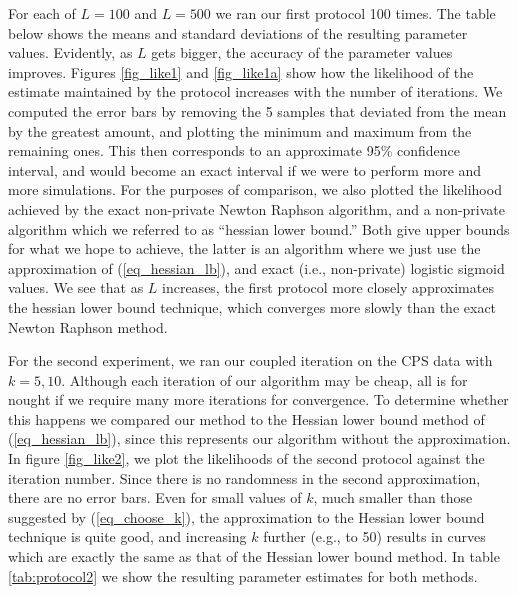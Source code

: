 \documentclass[11pt]{article}
\begin{document}
For each of $L=100$ and $L=500$ we ran our first protocol 100 times. The table below shows the means and standard deviations of the resulting parameter values.  Evidently, as $L$ gets bigger, the accuracy of the parameter values improves.  Figures \ref{fig_like1} and \ref{fig_like1a} show how the likelihood of the estimate maintained by the protocol increases with the number of iterations.  We computed the error bars   by removing the 5 samples that deviated from the mean by the greatest amount, and plotting the minimum and maximum from the remaining ones.  This then corresponds to an approximate 95\% confidence interval, and would become an exact interval if we were to perform more and more simulations.  For the purposes of comparison, we also plotted the likelihood achieved by the exact non-private Newton Raphson algorithm, and a non-private algorithm which we referred to as ``hessian lower bound.''  Both give upper bounds for what we  hope to achieve, the latter is an algorithm where we just use the approximation of (\ref{eq_hessian_lb}), and exact (i.e., non-private) logistic sigmoid values.  We see that as $L$ increases, the first protocol more closely approximates the hessian lower bound technique, which converges more slowly than the exact Newton Raphson method.

For the second experiment, we ran our coupled iteration on the CPS data with $k=5,10$. Although each iteration of our algorithm may be cheap, all is for nought if we require many more iterations for convergence. To determine whether this happens we compared our method to the Hessian lower bound method of (\ref{eq_hessian_lb}), since this represents our algorithm without the approximation. In figure \ref{fig_like2}, we plot the likelihoods of the second protocol against the iteration number.  Since there is no randomness in the second approximation, there are no error bars.  Even for small values of $k$, much smaller than those suggested by (\ref{eq_choose_k}), the approximation to the Hessian lower bound technique is quite good, and increasing $k$ further (e.g., to 50) results in curves which are exactly the same as that of the Hessian lower bound method.  In table \ref{tab:protocol2} we show the resulting parameter estimates for both methods.
\end{document}
